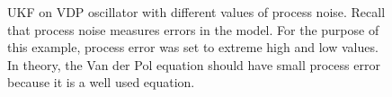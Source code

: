 \begin{figure}[!tbp]
  \centering
  \hfill
  \caption{UKF on VDP oscillator with different values of process noise.
  Recall that process noise measures errors in the model. For the purpose of this example, process error was set to extreme high and low values. In theory, the Van der Pol equation should have small process error because it is a well used equation.}
   
\end{figure}
 
